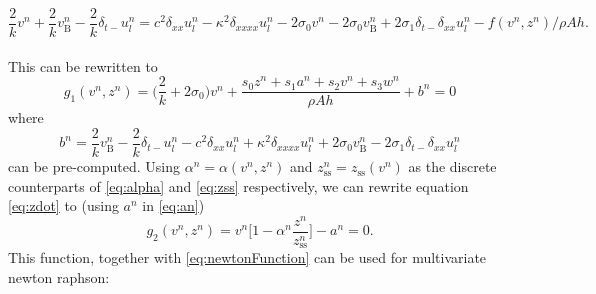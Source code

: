 \documentclass{article}
\begin{document}
\begin{equation}
\label{eq:stiffStringFDS}
\frac{2}{k}v^n + \frac{2}{k}v_\text{B}^n - \frac{2}{k}\delta_{t-}u_l^n =c^2 \delta_{xx} u_l^n -\kappa^2\delta_{xxxx} u_l^n - 2\sigma_0v^n - 2\sigma_0v_\text{B}^n
+ 2\sigma_1\delta_{t-}\delta_{xx}u_l^n - f(v^n, z^n)/\rho Ah.
\end{equation}
\\
This can be rewritten to
\begin{equation}\label{eq:newtonFunction}
g_1(v^n, z^n) = \Big(\frac{2}{k} + 2\sigma_0\Big)v^n + \frac{s_0z^n+s_1a^n+s_2v^n+s_3w^n}{\rho A h} + b^n = 0 \end{equation}
where
\begin{equation}
    b^n = \frac{2}{k}v_\text{B}^n-\frac{2}{k}\delta_{t-}u_l^n - c^2 \delta_{xx} u_l^n +\kappa^2\delta_{xxxx} u_l^n + 2\sigma_0v_\text{B}^n
- 2\sigma_1\delta_{t-}\delta_{xx}u_l^n
\end{equation}
can be pre-computed. Using $\alpha^n = \alpha(v^n, z^n)$ and $z_\text{ss}^n = z_\text{ss}(v^n)$ as the discrete counterparts of \eqref{eq:alpha} and \eqref{eq:zss} respectively, we can rewrite equation \eqref{eq:zdot} to (using $a^n$ in \eqref{eq:an})
\begin{equation}
   g_2(v^n,z^n) = v^n\bigg[1-\alpha^n\frac{z^n}{z_\text{ss}^n}\bigg] -  a^n = 0.
\end{equation}
This function, together with \eqref{eq:newtonFunction} can be used for multivariate newton raphson:
\end{document}
